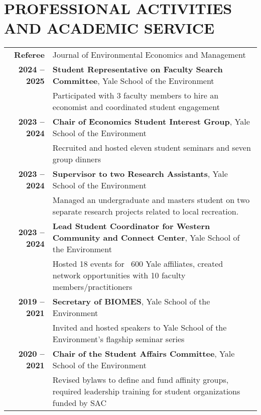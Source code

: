 \documentclass[11pt]{article}
\begin{document}
\section*{PROFESSIONAL ACTIVITIES AND ACADEMIC SERVICE}
\begin{longtable}{>{\bfseries}r p{5.5in}}%
    Referee & Journal of Environmental Economics and Management \\[1ex]
    2024 – 2025 & \textbf{Student Representative on Faculty Search Committee}, Yale School of the Environment \\
        & Participated with 3 faculty members to hire an economist and coordinated student engagement \\[1ex]
    2023 – 2024 & \textbf{Chair of Economics Student Interest Group}, Yale School of the Environment \\
        & Recruited and hosted eleven student seminars and seven group dinners \\[1ex]
    2023 – 2024 & \textbf{Supervisor to two Research Assistants}, Yale School of the Environment \\
        & Managed an undergraduate and masters student on two separate research projects related to local recreation.\\
    2023 – 2024 & \textbf{Lead Student Coordinator for Western Community and Connect Center}, Yale School of the Environment \\
        & Hosted 18 events for ~600 Yale affiliates, created network opportunities with 10 faculty members/practitioners \\[1ex]
    2019 – 2021 & \textbf{Secretary of BIOMES}, Yale School of the Environment \\
        & Invited and hosted speakers to Yale School of the Environment’s flagship seminar series \\[1ex]
    2020 – 2021 & \textbf{Chair of the Student Affairs Committee}, Yale School of the Environment \\
        & Revised bylaws to define and fund affinity groups, required leadership training for student organizations funded by SAC \\[1ex]
\end{longtable}
\end{document}
